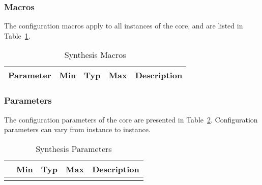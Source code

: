 \ifdefined\SM

\subsubsection{Macros}

The configuration macros apply to all instances of the core, and are listed in
Table~\ref{tab:sm}.

\begin{table}[h]
  \centering
    \begin{tabularx}{\textwidth}{ | c | c | c | c | X | }
    \hline
    \rowcolor{iob-green}
    {\bf Parameter} & {\bf Min} & {\bf Typ} & {\bf Max} & {\bf Description} \\\hline

    

    \end{tabularx}
  \caption{Synthesis Macros}
  \label{tab:sm}
\end{table}

\noindent

\fi

\ifdefined\SP

\subsubsection{Parameters}
\label{sec:cp}

The configuration parameters of the core are presented in
Table~\ref{tab:sp}. Configuration parameters can vary from instance to instance. \\

\begin{longtable}{|l|c|c|c|p{9cm}|}
    \hline
    \rowcolor{iob-green}
    \multicolumn{1}{|c}{\bf Parameter} & \multicolumn{1}{|c|}{\bf Min} & \multicolumn{1}{c|}{\bf Typ} & \multicolumn{1}{c|}{\bf Max} & \multicolumn{1}{c|}{\bf Description}  \\ \hline \hline

    
    
\caption{Synthesis Parameters}
  \label{tab:sp}
\end{longtable}

\fi
